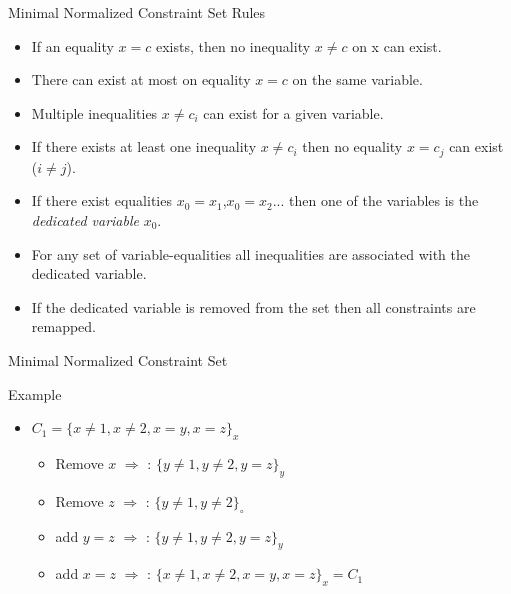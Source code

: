 \begin{frame}{Minimal Normalized Constraint Set Rules}
\begin{itemize}
\item If an equality $x=c$ exists, then no inequality $x\neq c$ on x can exist.
\item There can exist at most on equality $x=c$ on the same variable.
\item Multiple inequalities $x \neq c_i$ can exist for a given variable.
\item If there exists at least one inequality $x\neq c_i$ then no equality $x=c_j$ can exist ($i\neq j$).
\item If there exist equalities $x_0=x_1$,$x_0=x_2$$...$ then one of the variables is the {\em dedicated variable} $x_0$.
\item For any set of variable-equalities all inequalities are associated with the dedicated variable.
\item If the dedicated variable is removed from the set then all constraints are remapped.
\end{itemize}
\end{frame}

\begin{frame}{Minimal Normalized Constraint Set}

\begin{block}{Example}

\begin{itemize}
\item $C_1=\{x\neq 1, x\neq 2, x=y, x=z\}_x$ 
\begin{itemize}
\item Remove $x$ $\Rightarrow$ : $\{y\neq 1, y\neq 2, y=z\}_y$
\item Remove $z$ $\Rightarrow$ : $\{y\neq 1, y\neq 2\}_{\circ}$
\item add $y=z$ $\Rightarrow$ : $\{y\neq 1, y\neq 2, y=z\}_y$
\item add $x=z$ $\Rightarrow$ : $\{x\neq 1, x\neq 2, x=y, x=z\}_x=C_1$
\end{itemize}
\end{itemize}

\end{block}

\end{frame}

